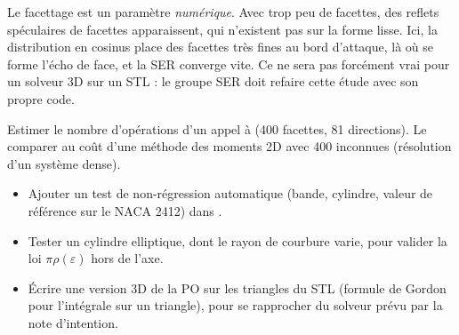 \begin{piege}
Le facettage est un paramètre \emph{numérique}. Avec trop peu de facettes, des reflets spéculaires de facettes apparaissent, qui n'existent pas sur la forme lisse. Ici, la distribution en cosinus place des facettes très fines au bord d'attaque, là où se forme l'écho de face, et la SER converge vite. Ce ne sera pas forcément vrai pour un solveur 3D sur un STL : le groupe SER doit refaire cette étude avec son propre code.
\end{piege}

\exercices
\begin{exercice}
Estimer le nombre d'opérations d'un appel à  (400 facettes, 81 directions). Le comparer au coût d'une méthode des moments 2D avec 400 inconnues (résolution d'un système dense).
\end{exercice}

\begin{pistes}
\begin{itemize}
\item Ajouter un test de non-régression automatique (bande, cylindre, valeur de référence sur le NACA 2412) dans .
\item Tester un cylindre elliptique, dont le rayon de courbure varie, pour valider la loi $\pi\rho(\varepsilon)$ hors de l'axe.
\item Écrire une version 3D de la PO sur les triangles du STL (formule de Gordon pour l'intégrale sur un triangle), pour se rapprocher du solveur prévu par la note d'intention.
\end{itemize}
\end{pistes}
